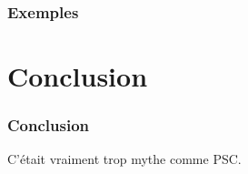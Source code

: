 \documentclass[12pt, handout]{beamer}
\begin{document}
\begin{frame}
 \frametitle{Exemples}
 
 
\end{frame}

\section{Conclusion}

\begin{frame}
 \frametitle{Conclusion}
 
C'était vraiment trop mythe comme PSC\@.
 
\end{frame}
\end{document}
